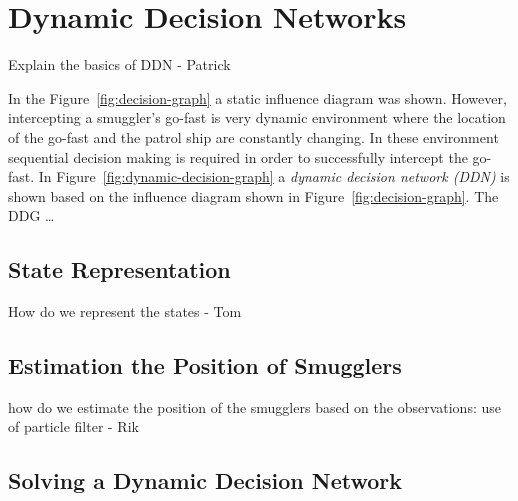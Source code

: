 \documentclass[conference]{IEEEtran}
\begin{document}


\section{Dynamic Decision Networks}



{\red Explain the basics of DDN - Patrick}

In the Figure~\ref{fig:decision-graph} a static influence diagram was shown. However, intercepting a smuggler's go-fast is very dynamic environment where the location of the go-fast and the patrol ship are constantly changing. In these environment sequential decision making is required in order to successfully intercept the go-fast. In Figure~\ref{fig:dynamic-decision-graph} a {\em dynamic decision network (DDN)} is shown based on the influence diagram shown in Figure~\ref{fig:decision-graph}. The DDG \ldots



\subsection{State Representation}

{\red How do we represent the states - Tom}


\subsection{Estimation the Position of Smugglers}


{\red how do we estimate the position of the smugglers based on the observations: use of particle filter - Rik}


\subsection{Solving a Dynamic Decision Network}
\end{document}
